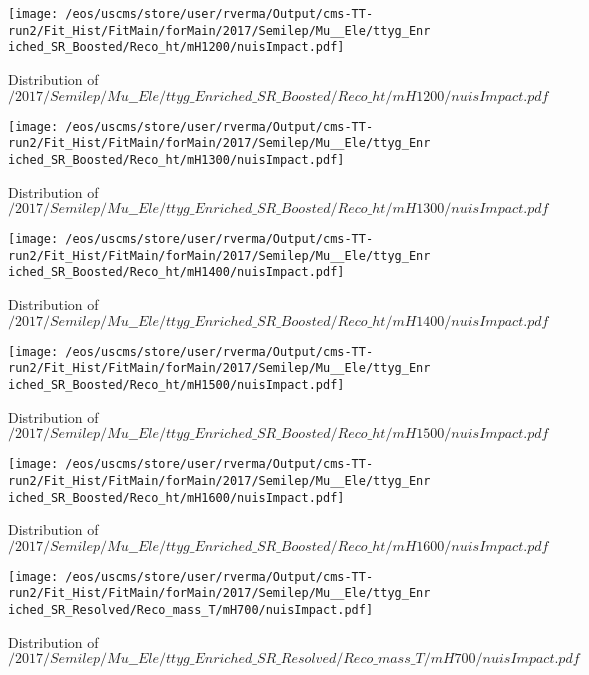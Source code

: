 \begin{figure}
\centering
\texttt{[image: /eos/uscms/store/user/rverma/Output/cms-TT-run2/Fit\_Hist/FitMain/forMain/2017/Semilep/Mu\_\_Ele/ttyg\_Enriched\_SR\_Boosted/Reco\_ht/mH1200/nuisImpact.pdf]}
\caption{Distribution of $/2017/Semilep/Mu\_\_Ele/ttyg\_Enriched\_SR\_Boosted/Reco\_ht/mH1200/nuisImpact.pdf$}
\end{figure}

\begin{figure}
\centering
\texttt{[image: /eos/uscms/store/user/rverma/Output/cms-TT-run2/Fit\_Hist/FitMain/forMain/2017/Semilep/Mu\_\_Ele/ttyg\_Enriched\_SR\_Boosted/Reco\_ht/mH1300/nuisImpact.pdf]}
\caption{Distribution of $/2017/Semilep/Mu\_\_Ele/ttyg\_Enriched\_SR\_Boosted/Reco\_ht/mH1300/nuisImpact.pdf$}
\end{figure}

\begin{figure}
\centering
\texttt{[image: /eos/uscms/store/user/rverma/Output/cms-TT-run2/Fit\_Hist/FitMain/forMain/2017/Semilep/Mu\_\_Ele/ttyg\_Enriched\_SR\_Boosted/Reco\_ht/mH1400/nuisImpact.pdf]}
\caption{Distribution of $/2017/Semilep/Mu\_\_Ele/ttyg\_Enriched\_SR\_Boosted/Reco\_ht/mH1400/nuisImpact.pdf$}
\end{figure}

\begin{figure}
\centering
\texttt{[image: /eos/uscms/store/user/rverma/Output/cms-TT-run2/Fit\_Hist/FitMain/forMain/2017/Semilep/Mu\_\_Ele/ttyg\_Enriched\_SR\_Boosted/Reco\_ht/mH1500/nuisImpact.pdf]}
\caption{Distribution of $/2017/Semilep/Mu\_\_Ele/ttyg\_Enriched\_SR\_Boosted/Reco\_ht/mH1500/nuisImpact.pdf$}
\end{figure}

\begin{figure}
\centering
\texttt{[image: /eos/uscms/store/user/rverma/Output/cms-TT-run2/Fit\_Hist/FitMain/forMain/2017/Semilep/Mu\_\_Ele/ttyg\_Enriched\_SR\_Boosted/Reco\_ht/mH1600/nuisImpact.pdf]}
\caption{Distribution of $/2017/Semilep/Mu\_\_Ele/ttyg\_Enriched\_SR\_Boosted/Reco\_ht/mH1600/nuisImpact.pdf$}
\end{figure}

\begin{figure}
\centering
\texttt{[image: /eos/uscms/store/user/rverma/Output/cms-TT-run2/Fit\_Hist/FitMain/forMain/2017/Semilep/Mu\_\_Ele/ttyg\_Enriched\_SR\_Resolved/Reco\_mass\_T/mH700/nuisImpact.pdf]}
\caption{Distribution of $/2017/Semilep/Mu\_\_Ele/ttyg\_Enriched\_SR\_Resolved/Reco\_mass\_T/mH700/nuisImpact.pdf$}
\end{figure}

